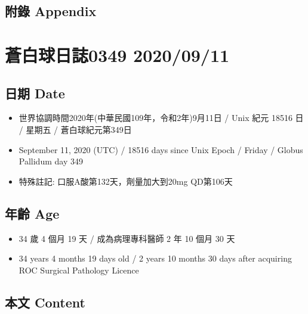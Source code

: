 \documentclass[
]{article}
\providecommand{\tightlist}{%
  \setlength{\itemsep}{0pt}\setlength{\parskip}{0pt}}
\begin{document}
\hypertarget{ux9644ux9304-appendix-9}{%
\subsection{附錄 Appendix}\label{ux9644ux9304-appendix-9}}

\hypertarget{ux84bcux767dux7403ux65e5ux8a8c0349-20200911}{%
\section{蒼白球日誌0349
2020/09/11}\label{ux84bcux767dux7403ux65e5ux8a8c0349-20200911}}

\hypertarget{ux65e5ux671f-date-10}{%
\subsection{日期 Date}\label{ux65e5ux671f-date-10}}

\begin{itemize}
\tightlist
\item
  世界協調時間2020年(中華民國109年，令和2年)9月11日 / Unix 紀元 18516 日
  / 星期五 / 蒼白球紀元第349日
\item
  September 11, 2020 (UTC) / 18516 days since Unix Epoch / Friday /
  Globus Pallidum day 349
\item
  特殊註記: 口服A酸第132天，劑量加大到20mg QD第106天
\end{itemize}

\hypertarget{ux5e74ux9f61-age-10}{%
\subsection{年齡 Age}\label{ux5e74ux9f61-age-10}}

\begin{itemize}
\tightlist
\item
  34 歲 4 個月 19 天 / 成為病理專科醫師 2 年 10 個月 30 天
\item
  34 years 4 months 19 days old / 2 years 10 months 30 days after
  acquiring ROC Surgical Pathology Licence
\end{itemize}

\hypertarget{ux672cux6587-content-10}{%
\subsection{本文 Content}\label{ux672cux6587-content-10}}
\end{document}
